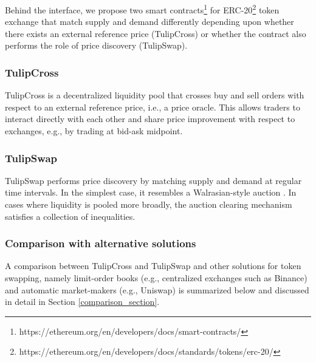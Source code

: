 \documentclass[11pt, reqno]{amsart}
\theoremstyle{definition}
\theoremstyle{remark}
\begin{document}
Behind the interface, we propose two smart
contracts\footnote{https://ethereum.org/en/developers/docs/smart-contracts/}
for
ERC-20\footnote{https://ethereum.org/en/developers/docs/standards/tokens/erc-20/}
token exchange that match supply and demand differently depending upon whether
there exists an external reference price (TulipCross) or whether the contract
also performs the role of price discovery (TulipSwap).

\subsubsection{TulipCross}
TulipCross is a decentralized liquidity pool that crosses buy and sell orders
with respect to an external reference price, i.e., a price oracle. This allows
traders to interact directly with each other and share price improvement with
respect to exchanges, e.g., by trading at bid-ask midpoint.

\subsubsection{TulipSwap}
TulipSwap performs price discovery by matching supply and demand at regular time
intervals. In the simplest case, it resembles a Walrasian-style auction
\cite{Wa}. In cases where liquidity is pooled more broadly, the auction clearing
mechanism satisfies a collection of inequalities.


\subsubsection{Comparison with alternative solutions}\label{comparison_table}
A comparison between TulipCross and TulipSwap and other solutions for token
swapping, namely limit-order books (e.g., centralized exchanges such as
Binance) and automatic market-makers (e.g., Uniswap) is summarized below
and discussed in detail in Section \ref{comparison_section}.
\end{document}
